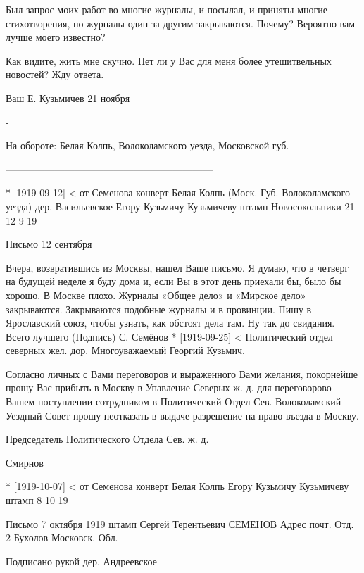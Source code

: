 \documentclass[]{memoir}
\begin{document}
Был запрос моих работ во многие журналы, и посылал, и приняты многие стихотворения, но журналы один за другим закрываются. Почему? Вероятно вам лучше моего известно?

Как видите, жить мне скучно. Нет ли у Вас для меня более утешитвельных новостей? Жду ответа.

Ваш Е. Кузьмичев 21 ноября

-

На обороте: Белая Колпь, Волоколамского уезда, Московской губ.

---------------------------------------------------------------

* [1919-09-12] < от Семенова
конверт 
Белая Колпь
(Моск. Губ. Волоколамского уезда)
дер. Васильевское
Егору Кузьмичу Кузьмичеву
штамп 
Новосокольники-21
12  9  19

Письмо
12 сентября

Вчера, возвратившись из Москвы, нашел Ваше письмо. Я думаю, что в четверг на будущей неделе я буду дома и, если Вы в этот день приехали бы, было бы хорошо.
В Москве плохо. Журналы «Общее дело» и «Мирское дело» закрываются. Закрываются подобные журналы и в провинции. Пишу в Ярославский союз, чтобы узнать, как обстоят дела там.
Ну так до свидания.
Всего лучшего
(Подпись) С. Семёнов
* [1919-09-25] < Политический отдел северных жел. дор.
Многоуважаемый Георгий Кузьмич.

Согласно личных с Вами переговоров и выраженного Вами желания, покорнейше прошу Вас прибыть в Москву в Упавление Северых ж. д. для переговорово Вашем поступлении сотрудником в Политический Отдел Сев.
Волоколамский Уездный Совет прошу неотказать в выдаче разрешение на право въезда в Москву.

Председатель Политического Отдела Сев. ж. д.

Смирнов

* [1919-10-07] < от Семенова
конверт
Белая Колпь
Егору Кузьмичу Кузьмичеву
штамп 
8  10  19

Письмо
7 октября 1919
штамп
Сергей Терентьевич СЕМЕНОВ
Адрес почт. Отд. 2 Бухолов Московск. Обл.

 Подписано рукой дер. Андреевское
\end{document}

